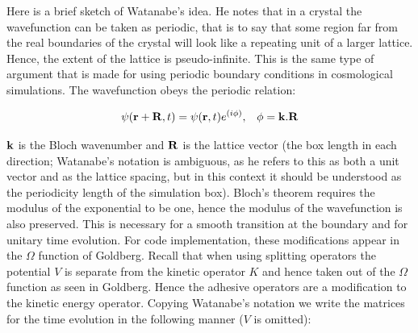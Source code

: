 Here is a brief sketch of Watanabe's idea. He notes that in a crystal the wavefunction can be taken as periodic, that is to say that some region far from the real boundaries of the crystal will look like a repeating unit of a larger lattice. Hence, the extent of the lattice is pseudo-infinite. This is the same type of argument that is made for using periodic boundary conditions in cosmological simulations. The wavefunction obeys the periodic relation:

\begin{equation}
\psi({\bf r} + {\bf R},t )= \psi({\bf r},t)e^{(i\phi)}, \;\;\; \phi = {\bf k}.{\bf R}
\end{equation}

\noindent ${\bf k}$ is the Bloch wavenumber and ${\bf R}$ is the lattice vector (the box length in each direction; Watanabe's notation is ambiguous, as he refers to this as both a unit vector and as the lattice spacing, but in this context it should be understood as the periodicity length of the simulation box). Bloch's theorem requires the modulus of the exponential to be one, hence the modulus of the wavefunction is also preserved. This is necessary for a smooth transition at the boundary and for unitary time evolution. For code implementation, these modifications appear in the $\Omega$ function of Goldberg. Recall that when using splitting operators the potential $V$ is separate from the kinetic operator $K$ and hence taken out of the $\Omega$ function as seen in Goldberg. Hence the adhesive operators are a modification to the kinetic energy operator. Copying Watanabe's notation we write the matrices for the time evolution in the following manner ($V$ is omitted):

